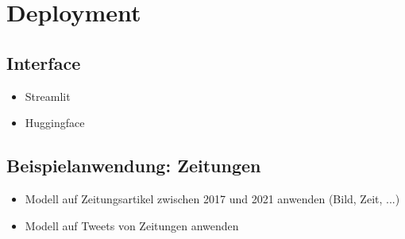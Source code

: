 \section{Deployment} \label{sec:deployment}

\subsection{Interface}

\begin{itemize}
    \item Streamlit
    \item Huggingface
\end{itemize}

\subsection{Beispielanwendung: Zeitungen}

\begin{itemize}
    \item Modell auf Zeitungsartikel zwischen 2017 und 2021 anwenden (Bild, Zeit, ...)
    \item Modell auf Tweets von Zeitungen anwenden
\end{itemize}
    